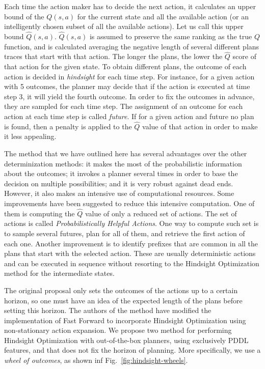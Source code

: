 \documentclass[../root.tex]{subfiles}
\begin{document}
Each time the action maker has to decide the next action, it calculates
an upper bound of the $ Q(s,a) $ for the current state and all the available action (or
an intelligently chosen subset of all the available actions). Let us call this
upper bound $ \hat{Q}(s,a) $. $ \hat{Q}(s,a) $ is assumed
to preserve the same ranking as the true $ Q $ function, and is calculated
averaging the negative length of several different plans traces that start with that action.
The longer the plans, the lower the $\hat{Q}$ score of that action for the given state. To obtain
different plans, the outcome of each action
is decided in \emph{hindsight} for each time step. For instance, for a given action with 5 outcomes,
the planner may decide that if the action is executed at time step 3, it will yield the fourth outcome.
In order to fix the outcomes in advance, they are sampled for each time step. The assignment of an
outcome for each action at each time step is called \emph{future}. If for a given action and future no
plan is found, then a penalty is applied to the $ \hat{Q} $ value of that action in order to make it less
appealing.

The method that we have outlined here has several advantages over the other determinization methods:
it makes the most of the probabilistic information about the outcomes; it invokes a planner several
times in order to base the decision on multiple possibilities; and it is very robust against
dead ends.
However, it also makes an intensive use of computational resources. Some improvements
have been suggested to reduce this intensive computation. One of them is computing
the $ \hat{Q} $ value of only a reduced set of actions. The set of actions is called
\emph{Probabilistically Helpful Actions}. One way to compute such set is to sample
several futures, plan for all of them, and retrieve the first action of each one. Another
improvement is to identify prefixes that are common in all the plans that start with the
selected action. These are usually deterministic actions and can be executed in sequence without
resorting to the Hindsight Optimization method for the intermediate states.

The original proposal only sets the outcomes of the actions up to
a certain horizon, so one must have an idea of the expected length of the plans before
setting this horizon. The authors of the method have modified the implementation of Fast Forward to
incorporate Hindsight Optimization using non-stationary action expansion. We propose
two method for performing Hindsight Optimization with out-of-the-box planners, using exclusively
PDDL features, and that does not fix the horizon of planning. More specifically, we use
a \emph{wheel of outcomes}, as shown inf Fig.~\ref{fig:hindsight-wheels}.
\end{document}
